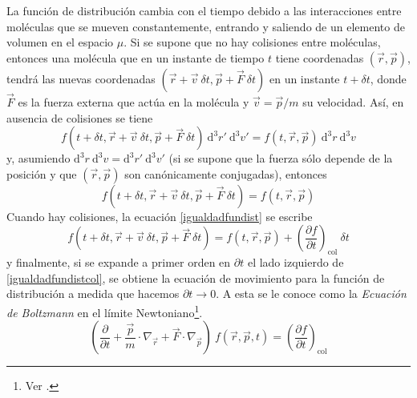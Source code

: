 \documentclass[11pt,twoside,openright,spanish]{report}
\numberwithin{equation}{chapter}
\numberwithin{figure}{chapter}
\numberwithin{table}{chapter}
\begin{document}
La función de distribución cambia con el tiempo debido a las interacciones entre moléculas que se mueven constantemente, entrando y saliendo de un elemento de volumen en el espacio $\mu$. Si se supone que no hay colisiones entre moléculas, entonces una molécula que en un instante de tiempo $t$ tiene coordenadas $\left(\vec{r},\vec{p}\right)$, tendrá las nuevas coordenadas $\left(\vec{r}+\vec{v}\ \delta t,\vec{p}+\vec{F}\ \delta t\right)$ en un instante $t+\delta t$, donde $\vec{F}$ es la fuerza externa que actúa en la molécula y $\vec{v}=\vec{p}/m$ su velocidad. Así, en ausencia de colisiones se tiene
\begin{equation}
f\left(t+\delta t,\vec{r}+\vec{v}\ \delta t,\vec{p}+\vec{F}\ \delta t \right)\ \text{d}^3r'\ \text{d}^3v'=f\left(t,\vec{r},\vec{p}\right)\ \text{d}^3r\ \text{d}^3v
\end{equation}
y, asumiendo $\text{d}^3r\ \text{d}^3v=\text{d}^3r'\ \text{d}^3v'$ (si se supone que la fuerza sólo depende de la posición y que $\left(\vec{r},\vec{p}\right)$ son canónicamente conjugadas), entonces
\begin{equation}
f\left(t+\delta t,\vec{r}+\vec{v}\ \delta t,\vec{p}+\vec{F}\ \delta t\right)=f\left(t,\vec{r},\vec{p}\right)
\label{igualdadfundist}
\end{equation}
Cuando hay colisiones, la ecuación \eqref{igualdadfundist} se escribe
\begin{equation}
f\left(t+\delta t,\vec{r}+\vec{v}\ \delta t,\vec{p}+\vec{F}\ \delta t\right)=f\left(t,\vec{r},\vec{p}\right)+\left(\frac{\partial f}{\partial t}\right)_{\text{col}}\ \delta t
\label{igualdadfundistcol}
\end{equation}
y finalmente, si se expande a primer orden en $\partial t$ el lado izquierdo de \eqref{igualdadfundistcol}, se obtiene la ecuación de movimiento para la función de distribución a medida que hacemos $\partial t\rightarrow 0$. A esta se le conoce como la \textit{Ecuación de Boltzmann} en el límite Newtoniano\footnote{Ver \citet{kerson}.}.
\begin{equation}
\left(\frac{\partial}{\partial t}+\frac{\vec{p}}{m}\cdot\nabla_{\vec{r}}+\vec{F}\cdot\nabla_{\vec{p}}\right)\ f\left(\vec{r},\vec{p},t\right)=\left(\frac{\partial f}{\partial t}\right)_{\text{col}}
\label{boltzmanneqnew}
\end{equation}
\end{document}
